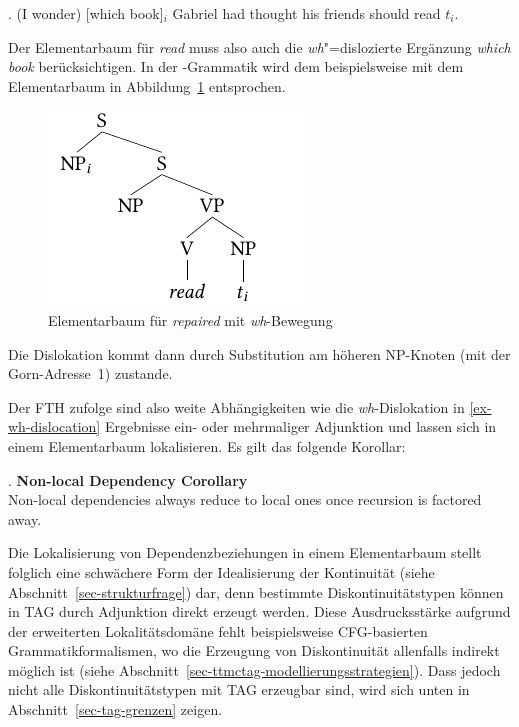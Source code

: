 \ex. \label{ex-wh-dislocation}  (I wonder) [which book]$_i$ Gabriel had thought his friends should read $t_i$. \hfill \citep[25]{Frank:02}

Der Elementarbaum für {\it read} muss also auch die \textit{wh}"=dislozierte Ergänzung {\it which book} berücksichtigen. In der -Grammatik wird dem beispielsweise mit dem Elementarbaum in Abbildung~\ref{fig-TAG-bsp1-2} entsprochen. 
\begin{figure}[t]
\centering
\includegraphics{graphics/abb57.pdf}
\caption{\label{fig-TAG-bsp1-2}Elementarbaum für {\it repaired} mit \textit{wh}-Bewegung}
\end{figure}
Die Dislokation kommt dann durch Substitution am höheren NP-Knoten (mit der Gorn-Adresse~1) zustande.

Der FTH zufolge sind also weite Abhängigkeiten wie die \textit{wh}-Dislokation in \ref{ex-wh-dislocation} Ergebnisse ein- oder mehrmaliger Adjunktion und lassen sich in einem Elementarbaum lokalisieren. Es gilt das folgende Korollar:

\ex. {\bf Non-local Dependency Corollary} \\
Non-local dependencies always reduce to local ones once recursion is factored away.
\citep[27]{Frank:02}

Die Lokalisierung von Dependenzbeziehungen in einem Elementarbaum stellt folglich eine schwächere Form der Idealisierung der Kontinuität (siehe Abschnitt~\ref{sec-strukturfrage}) dar, denn bestimmte Diskontinuitätstypen können in TAG durch Adjunktion direkt erzeugt werden. Diese Ausdrucksstärke aufgrund der erweiterten Lokalitätsdomäne fehlt beispielsweise CFG-basierten Grammatikformalismen, wo die Erzeugung von Diskontinuität allenfalls indirekt möglich ist (siehe Abschnitt~\ref{sec-ttmctag-modellierungsstrategien}). Dass jedoch nicht alle Diskontinuitätstypen mit TAG erzeugbar sind, wird sich unten in Abschnitt~\ref{sec-tag-grenzen} zeigen. \\   



